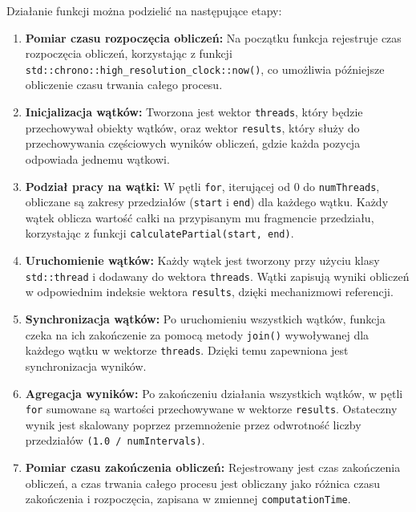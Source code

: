 \newpage
Działanie funkcji można podzielić na następujące etapy:

\begin{enumerate}
  \item \textbf{Pomiar czasu rozpoczęcia obliczeń:}
        Na początku funkcja rejestruje czas rozpoczęcia obliczeń, korzystając z funkcji \texttt{std::chrono::high\_resolution\_clock::now()}, co umożliwia późniejsze obliczenie czasu trwania całego procesu.

  \item \textbf{Inicjalizacja wątków:}
        Tworzona jest wektor \texttt{threads}, który będzie przechowywał obiekty wątków, oraz wektor \texttt{results}, który służy do przechowywania częściowych wyników obliczeń, gdzie każda pozycja odpowiada jednemu wątkowi.

  \item \textbf{Podział pracy na wątki:}
        W pętli \texttt{for}, iterującej od 0 do \texttt{numThreads}, obliczane są zakresy przedziałów (\texttt{start} i \texttt{end}) dla każdego wątku. Każdy wątek oblicza wartość całki na przypisanym mu fragmencie przedziału, korzystając z funkcji \texttt{calculatePartial(start, end)}.

  \item \textbf{Uruchomienie wątków:}
        Każdy wątek jest tworzony przy użyciu klasy \texttt{std::thread} i dodawany do wektora \texttt{threads}. Wątki zapisują wyniki obliczeń w odpowiednim indeksie wektora \texttt{results}, dzięki mechanizmowi referencji.

  \item \textbf{Synchronizacja wątków:}
        Po uruchomieniu wszystkich wątków, funkcja czeka na ich zakończenie za pomocą metody \texttt{join()} wywoływanej dla każdego wątku w wektorze \texttt{threads}. Dzięki temu zapewniona jest synchronizacja wyników.

  \item \textbf{Agregacja wyników:}
        Po zakończeniu działania wszystkich wątków, w pętli \texttt{for} sumowane są wartości przechowywane w wektorze \texttt{results}. Ostateczny wynik jest skalowany poprzez przemnożenie przez odwrotność liczby przedziałów \texttt{(1.0 / numIntervals)}.

  \item \textbf{Pomiar czasu zakończenia obliczeń:}
        Rejestrowany jest czas zakończenia obliczeń, a czas trwania całego procesu jest obliczany jako różnica czasu zakończenia i rozpoczęcia, zapisana w zmiennej \texttt{computationTime}.
\end{enumerate}

